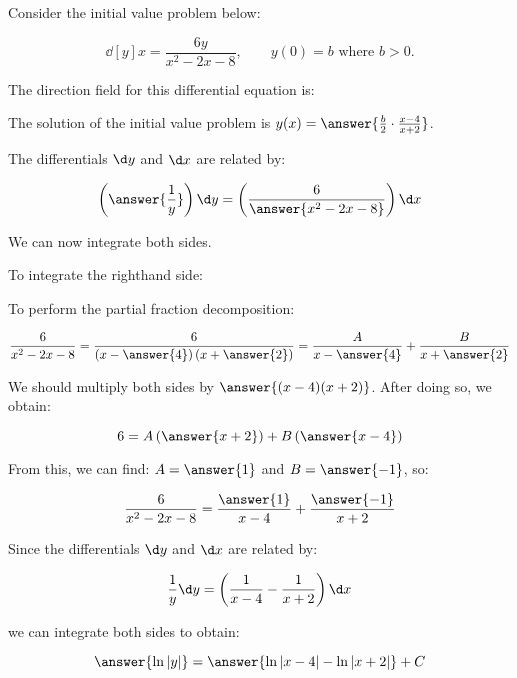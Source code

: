 \documentclass{ximera}
\author{Jim Talamo}
\begin{document}
\begin{exercise}
Consider the initial value problem below:

\[
\dd[y]{x} = \frac{6y}{x^2-2x-8}  , \qquad y(0)=b \textrm{ where } b>0.
\]

The direction field for this differential equation is:






The solution of the initial value problem is $y(x) = \answer{ \frac{b}{2} \cdot \frac{x-4}{x+2} }$.

\begin{hint}
The differentials $\d y$ and $\d x$ are related by:

\[
\left(\answer{\frac{1}{y}} \right) \d y = \left(\frac{6}{\answer{x^2-2x-8} } \right) \d x
\]

\begin{question}
We can now integrate both sides.

To integrate the righthand side:

\begin{multipleChoice}
\end{multipleChoice}

To perform the partial fraction decomposition:

\[
\frac{6}{x^2-2x-8} = \frac{6}{\left(x-\answer{4}\right)\left(x+\answer{2}\right)} = \frac{A}{x-\answer{4}}+\frac{B}{x+\answer{2}}
\]

We should multiply both sides by $\answer{(x-4)(x+2)}$.  After doing so, we obtain:

\[
6=A\left(\answer{x+2}\right)+B\left(\answer{x-4}\right)
\]

From this, we can find: $A=\answer{1}$ and $B=\answer{-1}$, so:

\[
\frac{6}{x^2-2x-8} = \frac{\answer{1}}{x-4}+\frac{\answer{-1}}{x+2}
\]


\begin{question}
Since the differentials $\d y$ and $\d x$ are related by:

\[
\frac{1}{y}  \d y = \left(\frac{1}{x-4}-\frac{1}{x+2} \right) \d x
\]

we can integrate both sides to obtain:

\[
\answer{\ln|y|} = \answer{\ln|x-4| - \ln|x+2|} +C\\
\]


\end{question}
\end{question}
\end{hint}
\end{exercise}
\end{document}
